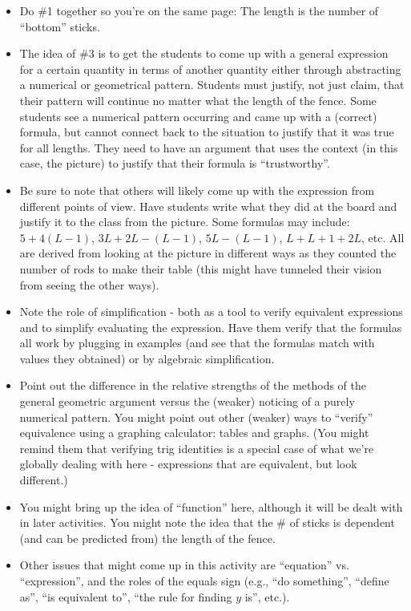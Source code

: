 \documentclass[nooutcomes,noauthor,handout]{ximera}
\begin{document}
\begin{instructorNotes}
\begin{itemize}
	\item Do \#1 together so you're on the same page: The length is the number of ``bottom'' sticks.
	\item The idea of \#3 is to get the students to come up with a general expression for a certain quantity in terms of another quantity either through abstracting a numerical or geometrical pattern. Students must justify, not just claim, that their pattern will continue no matter what the length of the fence. Some students see a numerical pattern occurring and came up with a (correct) formula, but cannot connect back to the situation to justify that it was true for all lengths. They need to have an argument that uses the context (in this case, the picture) to justify that their formula is ``trustworthy''.
	\item Be sure to note that others will likely come up with the expression from different points of view. Have students write what they did at the board and justify it to the class from the picture. Some formulas may include:
	$5 + 4(L-1)$, $3L + 2L - (L-1)$, $5L - (L-1)$, $L + L+1 + 2L$, etc. All are derived from looking at the picture in different ways as they counted the number of rods to make their table (this might have tunneled their vision from seeing the other ways).  
	\item Note the role of simplification - both as a tool to verify equivalent expressions and to simplify evaluating the expression. Have them verify that the formulas all work by plugging in examples (and see that the formulas match with values they obtained) or by algebraic simplification.
	\item	Point out the difference in the relative strengths of the methods of the general geometric argument versus the (weaker) noticing of a purely numerical pattern. You might point out other (weaker) ways to ``verify'' equivalence using a graphing calculator: tables and graphs. (You might remind them that verifying trig identities is a special case of what we're globally dealing with here - expressions that are equivalent, but look different.)
	\item You might bring up the idea of ``function'' here, although it will be dealt with in later activities. You might note the idea that the \# of sticks is dependent (and can be predicted from) the length of the fence.
	\item Other issues that might come up in this activity are ``equation'' vs. ``expression'', and the roles of the equals sign (e.g., ``do something'', ``define as'', ``is equivalent to'', ``the rule for finding $y$ is'', etc.).
\end{itemize}


\end{instructorNotes}
\end{document}
